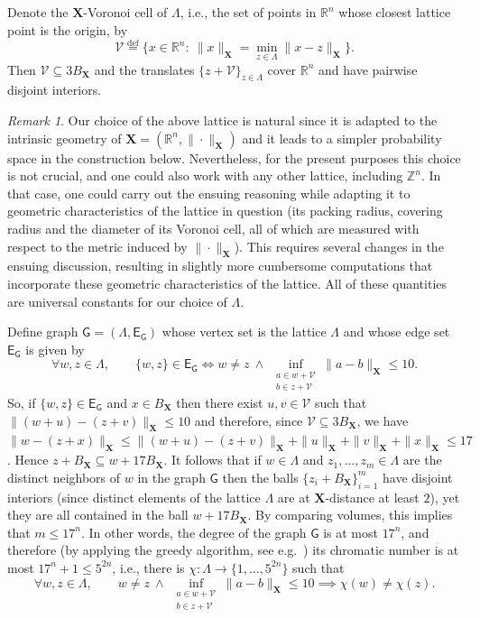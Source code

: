 \documentclass[11pt,reqno]{amsart}
\renewcommand{\le}{\leqslant}
\newcommand{\X}{\mathbf X}
\newcommand{\R}{\mathbb R}
\theoremstyle{remark}
\newtheorem{remark}[theorem]{Remark}
\renewcommand{\subset}{\subseteq}
\newcommand{\Z}{\mathbb Z}
\newcommand{\eqdef}{\stackrel{\mathrm{def}}{=}}
\renewcommand{\1}{\mathbf 1}
\newcommand{\DD}{\mathscr{V}}
\begin{document}
Denote the $\X$-Voronoi cell of $\Lambda$, i.e., the set of points in $\R^n$ whose closest lattice point is the origin, by $$
\DD\eqdef \Big\{x\in \R^n:\ \|x\|_{\X}= \min_{z\in \Lambda}\|x-z\|_{\X}\Big\}.
$$
Then $\DD\subset 3B_{\X}$ and the translates $\{z+\DD\}_{z\in \Lambda}$ cover $\R^n$ and have pairwise disjoint interiors.


\begin{remark}
Our choice of the above lattice is natural since it is adapted to the intrinsic geometry of $\X=(\R^n,\|\cdot\|_{\X})$ and it leads to a simpler probability space in the construction below. Nevertheless, for the present purposes this choice is not crucial, and one could also work with any other lattice, including $\Z^n$. In that case, one could carry out the ensuing reasoning while adapting it to geometric characteristics of the lattice in question (its packing radius, covering radius and the diameter of its Voronoi cell, all of which are measured with respect to the metric induced by $\|\cdot\|_{\X}$). This requires several changes in the ensuing discussion, resulting in slightly more cumbersome computations that incorporate these geometric characteristics of the lattice. All of these quantities are universal constants for our choice of $\Lambda$.
\end{remark}

Define graph $\mathsf{G}=(\Lambda,\mathsf{E}_{\mathsf{G}})$ whose vertex set is the lattice $\Lambda$ and whose edge set $\mathsf{E}_{\mathsf{G}}$ is given by
\begin{equation*}\label{eq:def lattice edges}
\forall  w,z\in \Lambda,\qquad \{w,z\}\in \mathsf{E}_{\mathsf{G}}\iff w\neq z\ \wedge\ \inf_{\substack{a\in w+\DD\\ b\in z+\DD}} \|a-b\|_{\X}\le 10.
\end{equation*}
So, if $\{w,z\}\in \mathsf{E}_{\mathsf{G}}$ and $x\in B_{\X}$ then there exist $u,v\in \DD$ such that $\|(w+u)-(z+v)\|_{\X}\le 10$ and therefore, since $\DD\subset 3B_{\X}$, we have $\|w-(z+x)\|_{\X}\le  \|(w+u)-(z+v)\|_{\X}+\|u\|_{\X}+\|v\|_{\X}+\|x\|_{\X}\le 17$. Hence $z+B_{\X}\subset w+17B_{\X}$. It follows that if $w\in \Lambda$ and $z_1,\ldots,z_m\in \Lambda$ are the distinct neighbors of $w$ in the graph $\mathsf{G}$ then the balls $\{z_i+B_{\X}\}_{i=1}^m$ have disjoint interiors (since distinct elements of the lattice $\Lambda$ are at $\X$-distance at least $2$), yet they are all contained in the ball $w+17B_{\X}$. By comparing volumes, this implies that $m\le 17^n$. In other words, the degree of the graph $\mathsf{G}$ is at most $17^n$, and therefore (by applying the greedy algorithm, see e.g.~\cite{Bro41}) its chromatic number is at most $17^n+1\le 5^{2n}$, i.e., there is   $\chi:\Lambda\to \{1,\ldots,5^{2n}\}$ such that
\begin{equation}\label{coloring conclusion}
\forall  w,z\in \Lambda,\qquad w\neq z\ \wedge\  \inf_{\substack{a\in w+\DD\\ b\in z+\DD}} \|a-b\|_{\X}\le 10\implies \chi(w)\neq \chi(z).
\end{equation}
\end{document}
